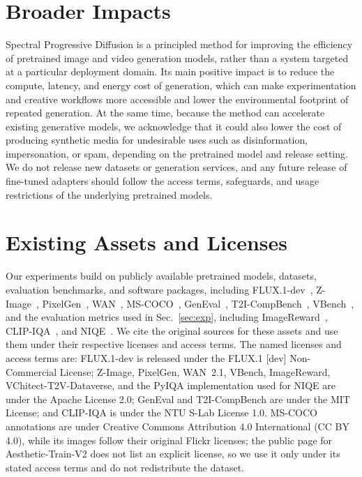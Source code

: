 \clearpage


\clearpage


\clearpage


\clearpage


\clearpage
\section{Broader Impacts}
\label{app:broader-impacts}

Spectral Progressive Diffusion is a principled method for improving the efficiency of pretrained image and video generation models, rather than a system targeted at a particular deployment domain. Its main positive impact is to reduce the compute, latency, and energy cost of generation, which can make experimentation and creative workflows more accessible and lower the environmental footprint of repeated generation. At the same time, because the method can accelerate existing generative models, we acknowledge that it could also lower the cost of producing synthetic media for undesirable uses such as disinformation, impersonation, or spam, depending on the pretrained model and release setting. We do not release new datasets or generation services, and any future release of fine-tuned adapters should follow the access terms, safeguards, and usage restrictions of the underlying pretrained models.

\section{Existing Assets and Licenses}
\label{app:assets-licenses}

Our experiments build on publicly available pretrained models, datasets, evaluation benchmarks, and software packages, including FLUX.1-dev~\citep{black2024flux}, Z-Image~\citep{zimage}, PixelGen~\citep{pixelgen}, WAN~\citep{wan}, MS-COCO~\citep{lin2014microsoft}, GenEval~\citep{geneval}, T2I-CompBench~\citep{t2icompbench}, VBench~\citep{vbench}, and the evaluation metrics used in Sec.~\ref{sec:exp}, including ImageReward~\citep{imagereward}, CLIP-IQA~\citep{wang2023clipiqa}, and NIQE~\citep{mittal2013niqe}. We cite the original sources for these assets and use them under their respective licenses and access terms.
The named licenses and access terms are: FLUX.1-dev is released under the FLUX.1 [dev] Non-Commercial License; Z-Image, PixelGen, WAN~2.1, VBench, ImageReward, VChitect-T2V-Dataverse, and the PyIQA implementation used for NIQE are under the Apache License 2.0; GenEval and T2I-CompBench are under the MIT License; and CLIP-IQA is under the NTU S-Lab License 1.0.
MS-COCO annotations are under Creative Commons Attribution 4.0 International (CC BY 4.0), while its images follow their original Flickr licenses; the public page for Aesthetic-Train-V2 does not list an explicit license, so we use it only under its stated access terms and do not redistribute the dataset.

